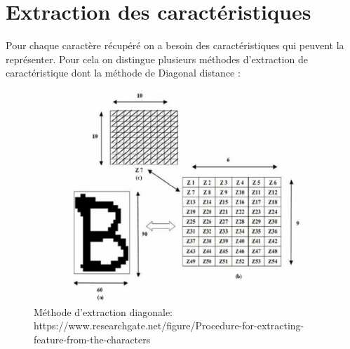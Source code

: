 \documentclass[12pt, letterpaper]{article}
\begin{document}
\section{Extraction des caractéristiques}
\par Pour chaque caractère récupéré on a besoin des caractéristiques qui peuvent la représenter. Pour cela on distingue plusieurs méthodes d’extraction de caractéristique dont la méthode de Diagonal distance : 
\begin{figure}[H]
    \includegraphics[width=12cm,height=8cm]{images/diagonal_methode.png}
    \caption{Méthode d'extraction diagonale: https://www.researchgate.net/figure/Procedure-for-extracting-feature-from-the-characters}
    \label{fig:L1}
\end{figure}
\end{document}

